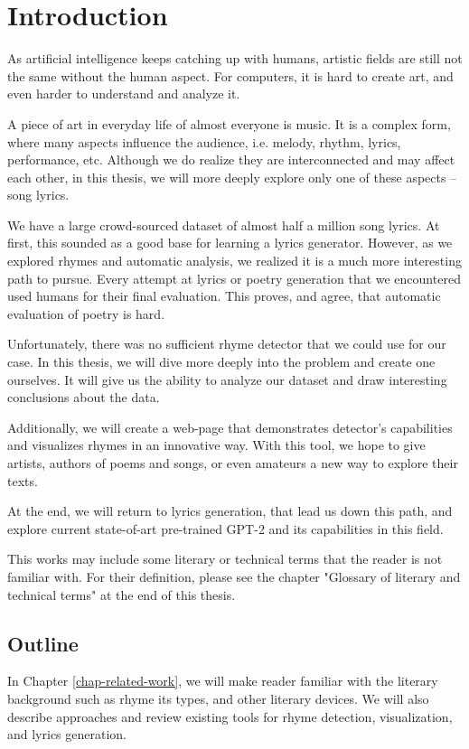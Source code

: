 \chapter*{Introduction}

As artificial intelligence keeps catching up with humans, artistic fields are still not the same without the human aspect. For computers, it is hard to create art, and even harder to understand and analyze it. 

A piece of art in everyday life of almost everyone is music. It is a complex form, where many aspects influence the audience, i.e. melody, rhythm, lyrics, performance, etc. Although we do realize they are interconnected and may affect each other, in this thesis, we will more deeply explore only one of these aspects -- song lyrics. 

We have a large crowd-sourced dataset of almost half a million song lyrics. At first, this sounded as a good base for learning a lyrics generator. However, as we explored rhymes and automatic analysis, we realized it is a much more interesting path to pursue. Every attempt at lyrics or poetry generation that we encountered used humans for their final evaluation. This proves, and \cite{greene2010automatic} agree, that automatic evaluation of poetry is hard.

Unfortunately, there was no sufficient rhyme detector that we could use for our case. In this thesis, we will dive more deeply into the problem and create one ourselves. It will give us the ability to analyze our dataset and draw interesting conclusions about the data. 

Additionally, we will create a web-page that demonstrates detector's capabilities and visualizes rhymes in an innovative way. With this tool, we hope to give artists, authors of poems and songs, or even amateurs a new way to explore their texts.

At the end, we will return to lyrics generation, that lead us down this path, and explore current state-of-art pre-trained GPT-2 and its capabilities in this field.

This works may include some literary or technical terms that the reader is not familiar with. For their definition, please see the chapter "Glossary of literary and technical terms" at the end of this thesis.


\section*{Outline}
In Chapter \ref{chap-related-work}, we will make reader familiar with the literary background such as rhyme its types, and other literary devices. We will also describe approaches and review existing tools for rhyme detection, visualization, and lyrics generation. 

